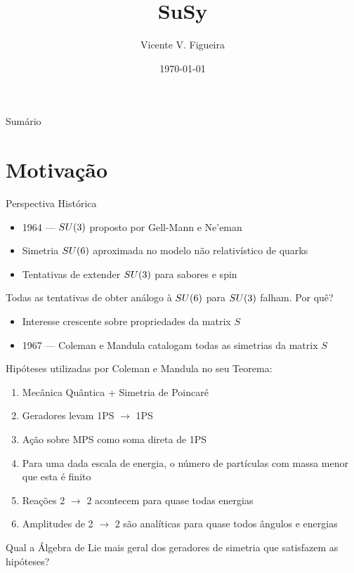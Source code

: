 \documentclass{beamer}
\title{SuSy}
\author{Vicente V. Figueira}
\institute{IF-USP}
\date{\today}
\begin{document}
\begin{frame}
    \titlepage
\end{frame}

\begin{frame}{Sumário}
    \tableofcontents
\end{frame}

\section{Motivação}
\begin{frame}{Perspectiva Histórica}
    \begin{itemize}
        \item 1964 --- $SU\qty(3)$ proposto por Gell-Mann e Ne'eman
        \item Simetria $SU\qty(6)$ aproximada no modelo não relativístico de quarks
        \item Tentativas de extender $SU\qty(3)$ para sabores e spin
    \end{itemize}
    Todas as tentativas de obter análogo à $SU\qty(6)$ para $SU\qty(3)$ falham. Por quê?
    \begin{itemize}
        \item Interesse crescente sobre propriedades da matrix $S$
        \item 1967 --- Coleman e Mandula catalogam todas as simetrias da matrix $S$
    \end{itemize}
\end{frame}

\begin{frame}
    Hipóteses utilizadas por Coleman e Mandula no seu Teorema:
    \begin{enumerate}
        \item Mecânica Quântica + Simetria de Poincaré
        \item Geradores levam 1PS $\rightarrow$ 1PS
        \item Ação sobre MPS como soma direta de 1PS
        \item Para uma dada escala de energia, o número de partículas com massa menor que esta é finito
        \item Reações 2 $\rightarrow$ 2 acontecem para quase todas energias
        \item Amplitudes de 2 $\rightarrow$ 2 são analíticas para quase todos ângulos e energias
    \end{enumerate}
    Qual a Álgebra de Lie mais geral dos geradores de simetria que satisfazem as hipóteses?
\end{frame}
\end{document}

